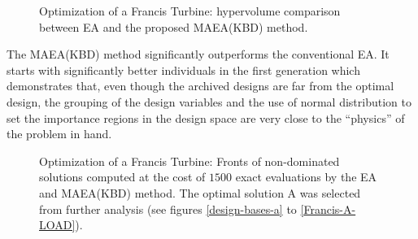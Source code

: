 \begin{figure}[h!]
\begin{minipage}[b]{1\linewidth}
 \centering
\end{minipage}
\caption{Optimization of a Francis Turbine: hypervolume comparison between EA and the proposed MAEA(KBD) method.}
\label{Francis-Res}
\end{figure}

The MAEA(KBD) method significantly outperforms the conventional EA. It starts with significantly better individuals in the first generation which demonstrates that, even though the archived designs are far from the optimal design, the grouping of the design variables and the use of normal distribution to set the importance regions in the design space are very close to the  ``physics'' of the problem in hand.    

\begin{figure}[h!]
\begin{minipage}[b]{1\linewidth}
 \centering
\end{minipage}
\caption{Optimization of a Francis Turbine: Fronts of non-dominated solutions computed at the cost of $1500$ exact evaluations by the EA and MAEA(KBD) method. The optimal solution A was selected from further analysis (see figures \ref{design-bases-a} to \ref{Francis-A-LOAD}).}
\label{Francis-Res-par}
\end{figure}

